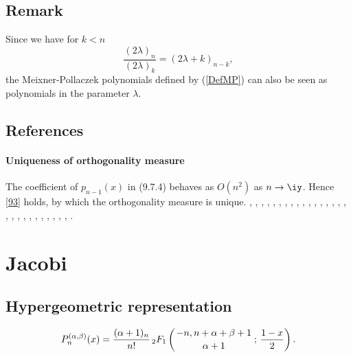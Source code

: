 \documentclass[envcountchap,graybox]{svmono}
\newcommand{\hyp}[5]{\mbox{}_{#1}{F}_{#2}
\left(\genfrac{}{}{0pt}{}{#3}{#4}\,;\,#5\right)}
\begin{document}
\subsection*{Remark}
Since we have for $k<n$
$$\frac{(2\lambda)_n}{(2\lambda)_k}=(2\lambda+k)_{n-k},$$
the Meixner-Pollaczek polynomials defined by (\ref{DefMP}) can also be seen as polynomials
in the parameter $\lambda$.

\subsection*{References}
\label{sec9.7}
%
\paragraph{Uniqueness of orthogonality measure}
The coefficient of $p_{n-1}(x)$ in (9.7.4) behaves as $O(n^2)$ as $n\to\iy$.
Hence \eqref{93} holds, by which the orthogonality measure is unique.
%
\cite{AlSalam90}, \cite{AlSalamChihara76}, \cite{AndrewsAskey85}, \cite{Araaya2004},
\cite{Araaya2005}, \cite{Askey89I}, \cite{AskeyWilson85}, \cite{AtakRahmanSuslov},
\cite{AtakSuslov88}, \cite{CharrisIsmail}, \cite{ChenIsmail97}, \cite{Chihara78},
\cite{Ismail85II}, \cite{Ismail94}, \cite{Ismail2005II}, \cite{IsmailLi},
\cite{IsmailStanton97}, \cite{Koekoek2000}, \cite{Koorn88}, \cite{Koorn89II},
\cite{LabelleYehI}, \cite{LabelleYehII}, \cite{Lesky95II}, \cite{LiWong}, \cite{Meixner},
\cite{Nikiforov+}, \cite{Rahman78I}, \cite{Wilson80}, \cite{Wimp90}.


\section{Jacobi}

\par\setcounter{equation}{0}

\subsection*{Hypergeometric representation}
\begin{equation}
\label{DefJacobi}
P_n^{(\alpha,\beta)}(x)=\frac{(\alpha+1)_n}{n!}\,
\hyp{2}{1}{-n,n+\alpha+\beta+1}{\alpha+1}{\frac{1-x}{2}}.
\end{equation}
\end{document}
